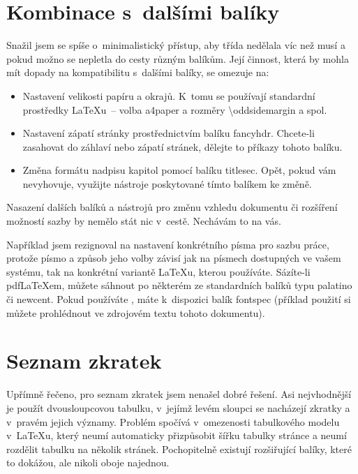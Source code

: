 \documentclass[FM,BP]{tulthesis}
\newcommand{\argument}[1]{{\ttfamily\color{\tulcolor}#1}}
\newcommand{\prikazneindex}[1]{\argument{\textbackslash #1}}
\begin{document}
\section{Kombinace s~dalšími balíky}

Snažil jsem se spíše o~minimalistický přístup, aby třída nedělala víc než musí
a pokud možno se nepletla do cesty různým balíkům. Její činnost, která by
mohla mít dopady na kompatibilitu s~dalšími balíky, se omezuje na:

\begin{itemize}
\item Nastavení velikosti papíru a okrajů. K~tomu se používají standardní
prostředky \LaTeX u~-- volba \argument{a4paper} a rozměry
\prikazneindex{oddsidemargin} a spol.

\item Nastavení zápatí stránky prostřednictvím balíku \argument{fancyhdr}.
Chcete-li zasahovat do záhlaví nebo zápatí stránek, dělejte to příkazy tohoto
balíku.

\item Změna formátu nadpisu kapitol pomocí balíku \argument{titlesec}. Opět,
pokud vám nevyhovuje, využijte nástroje poskytované tímto balíkem ke změně.

\end{itemize}

Nasazení dalších balíků a nástrojů pro změnu vzhledu dokumentu či rozšíření
možností sazby by nemělo stát nic v~cestě. Nechávám to na vás.

Například jsem rezignoval na nastavení konkrétního písma pro sazbu práce,
protože písmo a způsob jeho volby závisí jak na písmech dostupných ve vašem
systému, tak na konkrétní variantě \LaTeX u, kterou používáte. Sázíte-li
pdf\-\LaTeX\-em, můžete sáhnout po některém ze standardních balíků typu
\argument{palatino} či \argument{newcent}. Pokud používáte \XeLaTeX, máte
k~dispozici balík \argument{fontspec} (příklad použití si můžete prohlédnout ve
zdrojovém textu tohoto dokumentu).


\section{Seznam zkratek}\label{zkratky}

Upřímně řečeno, pro seznam zkratek jsem nenašel dobré řešení. Asi nejvhodnější
je použít dvousloupcovou tabulku, v~jejímž levém sloupci se nacházejí zkratky a
v~pravém jejich významy. Problém spočívá v~omezenosti tabulkového modelu
v~\LaTeX u, který neumí automaticky přizpůsobit šířku tabulky stránce a neumí
rozdělit tabulku na několik stránek. Pochopitelně existují rozšiřující balíky,
které to dokážou, ale nikoli oboje najednou.
\end{document}
